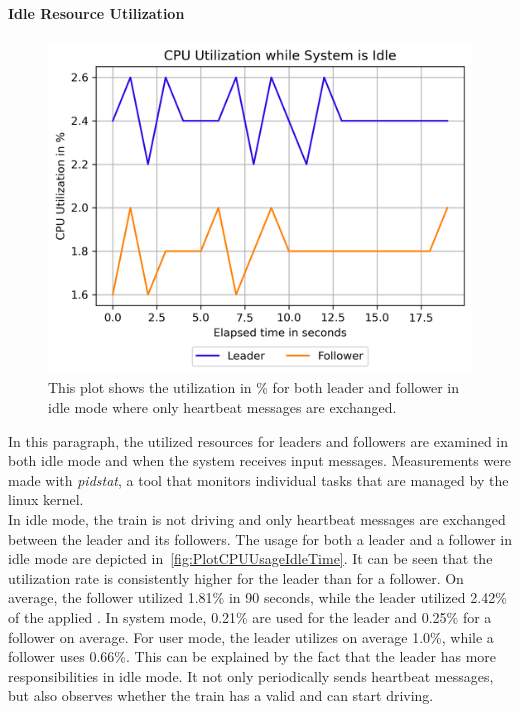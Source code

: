 
\paragraph{Idle Resource Utilization}
\begin{figure}[!hb]
	\centering
	\includegraphics[width=0.75\linewidth]{images/plots/CPUUsageIdleTime}
	\caption{This plot shows the  utilization in \% for both leader and follower in idle mode where only heartbeat messages are exchanged.}
	\label{fig:PlotCPUUsageIdleTime}
\end{figure}

In this paragraph, the utilized  resources for leaders and followers are examined in both idle mode and when the system receives input messages.
Measurements were made with \textit{pidstat}, a tool that monitors individual tasks that are managed by the linux kernel.
\\

In idle mode, the train is not driving and only heartbeat messages are exchanged between the leader and its followers.
The  usage for both a leader and a follower in idle mode are depicted in~\autoref{fig:PlotCPUUsageIdleTime}.
It can be seen that the utilization rate is consistently higher for the leader than for a follower.
On average, the follower utilized 1.81\% in 90 seconds, while the leader utilized 2.42\% of the applied .
In system mode, 0.21\% are used for the leader and 0.25\% for a follower on average.
For user mode, the leader utilizes on average 1.0\%, while a follower uses 0.66\%.
This can be explained by the fact that the leader has more responsibilities in idle mode.
It not only periodically sends heartbeat messages, but also observes whether the train has a valid  and can start driving.


